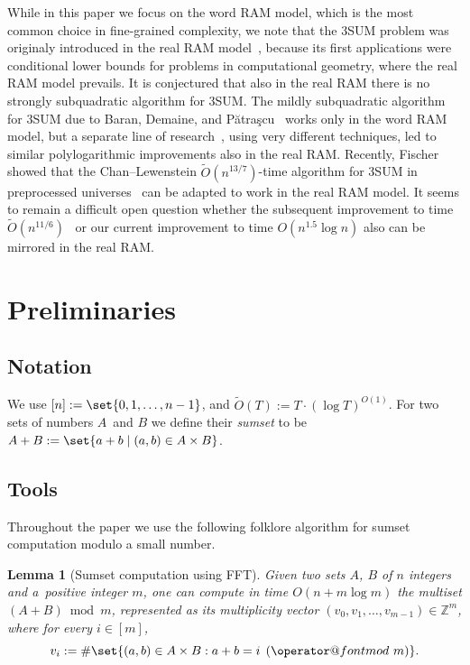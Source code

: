 \documentclass[10pt,a4paper]{article}
\makeatletter
\newtheorem{lemma}{Lemma}[section]
\newcommand{\Ot}{\widetilde{O}}
\newcommand{\tpmod}[1]{\mkern 8mu({\operator@font mod}\mkern 6mu#1)}
\makeatother
\begin{document}
While in this paper we focus on the word RAM model, which is the most common choice in fine-grained complexity, we note that the 3SUM problem was originaly introduced in the real RAM model~\cite{GajentaanO95}, because its first applications were conditional lower bounds for problems in computational geometry, where the real RAM model prevails. It is conjectured that also in the real RAM there is no strongly subquadratic algorithm for 3SUM. The mildly subquadratic algorithm for 3SUM due to Baran, Demaine, and P{\u{a}}tra{\c{s}}cu~\cite{BaranDP08} works only in the word RAM model, but a separate line of research~\cite{GronlundP18,Chan20}, using very different techniques, led to similar polylogarithmic improvements also in the real RAM. Recently, Fischer~\cite{Fischer25} showed that the Chan--Lewenstein $\Ot(n^{13/7})$-time algorithm for 3SUM in preprocessed universes~\cite{ChanL15} can be adapted to work in the real RAM model. It seems to remain a difficult open question whether the subsequent improvement to time $\Ot(n^{11/6})$~\cite{ChanWX23} or our current improvement to time $O(n^{1.5} \log n)$ also can be mirrored in the real RAM.

\section{Preliminaries}

\subsection{Notation}

We use $[n] := \set{0, 1, \ldots, n-1}$, and $\Ot(T) := T \cdot (\log T)^{O(1)}$. For two sets of numbers $A$~and $B$ we define their \emph{sumset} to be $A + B := \set{a+b \mid (a, b) \in A \times B}$.

\subsection{Tools}
Throughout the paper we use the following folklore algorithm for sumset computation modulo a small number.

\begin{lemma}[Sumset computation using FFT]\label{lem:fft}
Given two sets $A$, $B$ of $n$ integers and a~positive integer $m$, one can compute in time $O(n + m \log m)$ the multiset $(A + B) \bmod m$, represented as its multiplicity vector $(v_0, v_1, \ldots, v_{m-1}) \in \mathbb{Z}^m$, where for every $i \in [m]$,
\[v_i := \#\set{(a, b) \in A \times B : a + b = i \tpmod{m}}.\]
\end{lemma}
\end{document}
